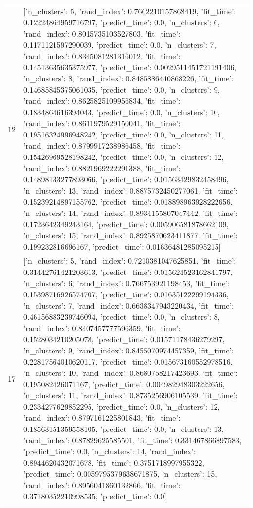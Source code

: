 \begin{tabular}{rl}
12 & [{'n_clusters': 5, 'rand_index': 0.7662210157868419, 'fit_time': 0.12224864959716797, 'predict_time': 0.0}, {'n_clusters': 6, 'rand_index': 0.8015735103527803, 'fit_time': 0.1171121597290039, 'predict_time': 0.0}, {'n_clusters': 7, 'rand_index': 0.8345081281316012, 'fit_time': 0.14513635635375977, 'predict_time': 0.0029511451721191406}, {'n_clusters': 8, 'rand_index': 0.8485886440868226, 'fit_time': 0.14685845375061035, 'predict_time': 0.0}, {'n_clusters': 9, 'rand_index': 0.8625825109956834, 'fit_time': 0.1834864616394043, 'predict_time': 0.0}, {'n_clusters': 10, 'rand_index': 0.8611979529150041, 'fit_time': 0.19516324996948242, 'predict_time': 0.0}, {'n_clusters': 11, 'rand_index': 0.8799917238986458, 'fit_time': 0.15426969528198242, 'predict_time': 0.0}, {'n_clusters': 12, 'rand_index': 0.8821969222291388, 'fit_time': 0.14898133277893066, 'predict_time': 0.01563429832458496}, {'n_clusters': 13, 'rand_index': 0.8875732450277061, 'fit_time': 0.15239214897155762, 'predict_time': 0.018898963928222656}, {'n_clusters': 14, 'rand_index': 0.8934155807047442, 'fit_time': 0.1723642349243164, 'predict_time': 0.005906581878662109}, {'n_clusters': 15, 'rand_index': 0.8925870623411877, 'fit_time': 0.199232816696167, 'predict_time': 0.01636481285095215}] \\
17 & [{'n_clusters': 5, 'rand_index': 0.7210381047625851, 'fit_time': 0.31442761421203613, 'predict_time': 0.015624523162841797}, {'n_clusters': 6, 'rand_index': 0.766753921198453, 'fit_time': 0.15398716926574707, 'predict_time': 0.01635122299194336}, {'n_clusters': 7, 'rand_index': 0.6638347943220434, 'fit_time': 0.46156883239746094, 'predict_time': 0.0}, {'n_clusters': 8, 'rand_index': 0.8407457777596359, 'fit_time': 0.1528034210205078, 'predict_time': 0.01571178436279297}, {'n_clusters': 9, 'rand_index': 0.8455070974457359, 'fit_time': 0.22817564010620117, 'predict_time': 0.015673160552978516}, {'n_clusters': 10, 'rand_index': 0.8680758217423693, 'fit_time': 0.195082426071167, 'predict_time': 0.004982948303222656}, {'n_clusters': 11, 'rand_index': 0.8735256906105539, 'fit_time': 0.2334277629852295, 'predict_time': 0.0}, {'n_clusters': 12, 'rand_index': 0.8797161225801843, 'fit_time': 0.18563151359558105, 'predict_time': 0.0}, {'n_clusters': 13, 'rand_index': 0.87829625585501, 'fit_time': 0.331467866897583, 'predict_time': 0.0}, {'n_clusters': 14, 'rand_index': 0.8944620432071678, 'fit_time': 0.3751718997955322, 'predict_time': 0.0059795379638671875}, {'n_clusters': 15, 'rand_index': 0.8956041860132866, 'fit_time': 0.37180352210998535, 'predict_time': 0.0}] \\

\end{tabular}
